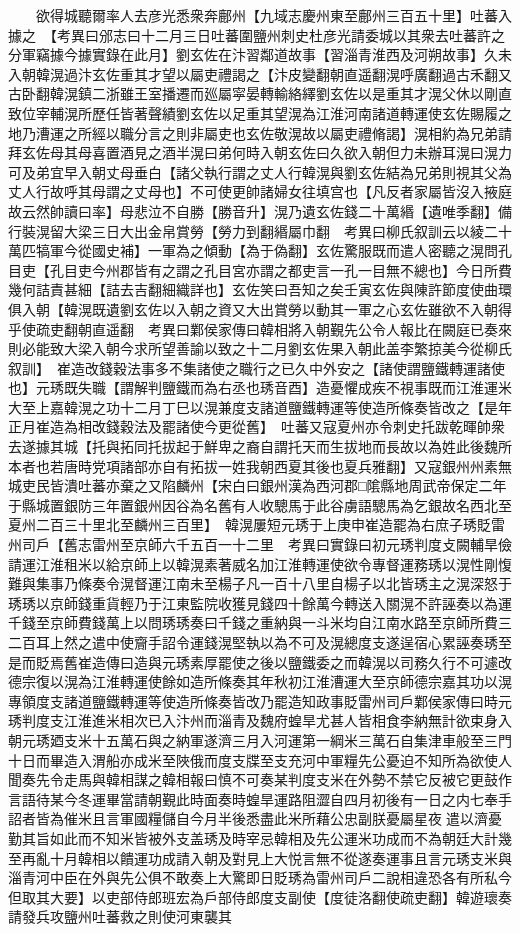 　　欲得城聽爾率人去彦光悉衆奔鄜州【九域志慶州東至鄜州三百五十里】吐蕃入據之　【考異曰邠志曰十二月三日吐蕃圍鹽州刺史杜彦光請委城以其衆去吐蕃許之分軍竊據今據實錄在此月】劉玄佐在汴習鄰道故事【習淄青淮西及河朔故事】久未入朝韓滉過汴玄佐重其才望以屬吏禮謁之【汴皮變翻朝直遥翻滉呼廣翻過古禾翻又古卧翻韓滉鎮二浙雖王室播遷而廵屬寜晏轉輸絡繹劉玄佐以是重其才滉父休以剛直致位宰輔滉所歷任皆著聲績劉玄佐以足重其望滉為江淮河南諸道轉運使玄佐賜履之地乃漕運之所經以職分言之則非屬吏也玄佐敬滉故以屬吏禮脩謁】滉相約為兄弟請拜玄佐母其母喜置酒見之酒半滉曰弟何時入朝玄佐曰久欲入朝但力未辦耳滉曰滉力可及弟宜早入朝丈母垂白【諸父執行謂之丈人行韓滉與劉玄佐結為兄弟則視其父為丈人行故呼其母謂之丈母也】不可使更帥諸婦女往填宫也【凡反者家屬皆沒入掖庭故云然帥讀曰率】母悲泣不自勝【勝音升】滉乃遺玄佐錢二十萬緡【遺唯季翻】備行裝滉留大梁三日大出金帛賞勞【勞力到翻緡屬巾翻　考異曰柳氏叙訓云以綾二十萬匹犒軍今從國史補】一軍為之傾動【為于偽翻】玄佐驚服既而遣人密聽之滉問孔目吏【孔目吏今州郡皆有之謂之孔目宮亦謂之都吏言一孔一目無不總也】今日所費幾何詰責甚細【詰去吉翻細織詳也】玄佐笑曰吾知之矣壬寅玄佐與陳許節度使曲環俱入朝【韓滉既遺劉玄佐以入朝之資又大出賞勞以動其一軍之心玄佐雖欲不入朝得乎使疏吏翻朝直遥翻　考異曰鄴侯家傳曰韓相將入朝覲先公令人報比在闕庭已奏來則必能致大梁入朝今求所望善諭以致之十二月劉玄佐果入朝此盖李繁掠美今從柳氏叙訓】　崔造改錢穀法事多不集諸使之職行之已久中外安之【諸使謂鹽鐵轉運諸使也】元琇既失職【謂解判鹽鐵而為右丞也琇音酉】造憂懼成疾不視事既而江淮運米大至上嘉韓滉之功十二月丁巳以滉兼度支諸道鹽鐵轉運等使造所條奏皆改之【是年正月崔造為相改錢穀法及罷諸使今更從舊】　吐蕃又寇夏州亦令刺史托跋乾暉帥衆去遂據其城【托與拓同托拔起于鮮卑之裔自謂托天而生拔地而長故以為姓此後魏所本者也若唐時党項諸部亦自有拓拔一姓我朝西夏其後也夏兵雅翻】又寇銀州州素無城吏民皆潰吐蕃亦棄之又陷麟州【宋白曰銀州漢為西河郡□隂縣地周武帝保定二年于縣城置銀防三年置銀州因谷為名舊有人收驄馬于此谷虜語驄馬為乞銀故名西北至夏州二百三十里北至麟州三百里】　韓滉屢短元琇于上庚申崔造罷為右庶子琇貶雷州司戶【舊志雷州至京師六千五百一十二里　考異曰實錄曰初元琇判度攴闕輔旱儉請運江淮租米以給京師上以韓滉素著威名加江淮轉運使欲令專督運務琇以滉性剛愎難與集事乃條奏令滉督運江南未至楊子凡一百十八里自楊子以北皆琇主之滉深怒于琇琇以京師錢重貨輕乃于江東監院收獲見錢四十餘萬今轉送入關滉不許誣奏以為運千錢至京師費錢萬上以問琇琇奏曰千錢之重納與一斗米均自江南水路至京師所費三二百耳上然之遣中使齎手詔令運錢滉堅執以為不可及滉總度支遂逞宿心累誣奏琇至是而貶焉舊崔造傳曰造與元琇素厚罷使之後以鹽鐵委之而韓滉以司務久行不可遽改德宗復以滉為江淮轉運使餘如造所條奏其年秋初江淮漕運大至京師德宗嘉其功以滉專領度支諸道鹽鐵轉運等使造所條奏皆改乃罷造知政事貶雷州司戶鄴侯家傳曰時元琇判度支江淮進米相次已入汴州而淄青及魏府蝗旱尤甚人皆相食李納無計欲束身入朝元琇廼支米十五萬石與之納軍遂濟三月入河運第一綱米三萬石自集津車般至三門十日而畢造入渭船亦成米至陜俄而度支牒至支充河中軍糧先公憂迫不知所為欲使人聞奏先令走馬與韓相謀之韓相報曰慎不可奏某判度支米在外勢不禁它反被它更鼓作言語待某今冬運畢當請朝覲此時面奏時蝗旱運路阻澀自四月初後有一日之内七奉手詔者皆為催米且言軍國糧儲自今月半後悉盡此米所藉公忠副朕憂屬星夜遣以濟憂勤其旨如此而不知米皆被外支盖琇及時宰忌韓相及先公運米功成而不為朝廷大計幾至再亂十月韓相以饋運功成請入朝及對見上大悦言無不從遂奏運事且言元琇支米與淄青河中臣在外與先公俱不敢奏上大驚即日貶琇為雷州司戶二說相違恐各有所私今但取其大要】以吏部侍郎班宏為戶部侍郎度支副使【度徒洛翻使疏吏翻】韓遊瓌奏請發兵攻鹽州吐蕃救之則使河東襲其

